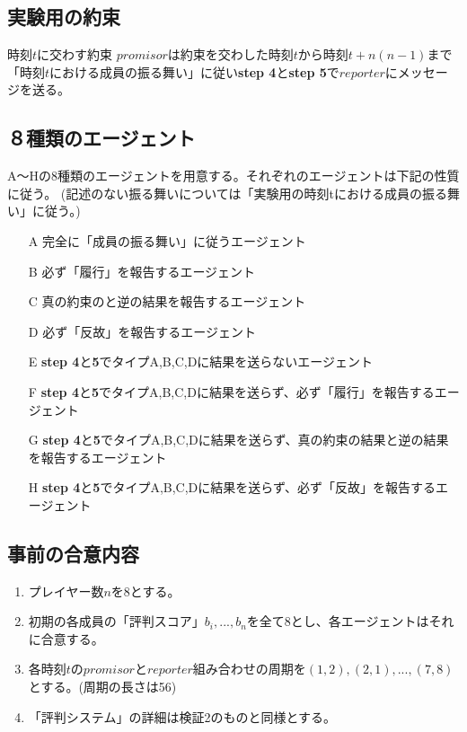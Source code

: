   \subsection{実験用の約束}
  \label{promiseForExperiments}
  \begin{itembox}[l]{時刻$t$に交わす約束}
    $promisor$は約束を交わした時刻$t$から時刻$t+n(n-1)$まで「時刻$t$における成員の振る舞い」に従い\textbf{step 4}と\textbf{step 5}で$reporter$にメッセージを送る。
  \end{itembox}

  \subsection{８種類のエージェント}
  \label{agentsForExperiments2}
    A〜Hの8種類のエージェントを用意する。それぞれのエージェントは下記の性質に従う。
    (記述のない振る舞いについては「実験用の時刻tにおける成員の振る舞い」に従う。)
    \begin{itemize}
      \item[A] 完全に「成員の振る舞い」に従うエージェント
      \item[B] 必ず「履行」を報告するエージェント
      \item[C] 真の約束のと逆の結果を報告するエージェント
      \item[D] 必ず「反故」を報告するエージェント
      \item[E] \textbf{step 4}と\textbf{5}でタイプA,B,C,Dに結果を送らないエージェント
      \item[F] \textbf{step 4}と\textbf{5}でタイプA,B,C,Dに結果を送らず、必ず「履行」を報告するエージェント
      \item[G] \textbf{step 4}と\textbf{5}でタイプA,B,C,Dに結果を送らず、真の約束の結果と逆の結果を報告するエージェント
      \item[H] \textbf{step 4}と\textbf{5}でタイプA,B,C,Dに結果を送らず、必ず「反故」を報告するエージェント
    \end{itemize}

  \subsection{事前の合意内容}
    \begin{enumerate}
      \item プレイヤー数$n$を$8$とする。
      \item 初期の各成員の「評判スコア」${b_i, ..., b_n}$を全て$8$とし、各エージェントはそれに合意する。
      \item 各時刻$t$の$promisor$と$reporter$組み合わせの周期を$(1, 2), (2, 1), ..., (7, 8)$とする。(周期の長さは56)
      \item 「評判システム」の詳細は検証2のものと同様とする。
    \end{enumerate}

